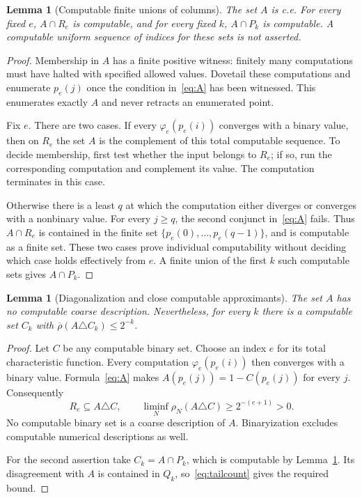 \documentclass[11pt,a4paper]{article}
\newcommand{\udens}{\overline\rho}
\newtheorem{lemma}[theorem]{Lemma}
\theoremstyle{definition}
\theoremstyle{remark}
\begin{document}
\begin{lemma}[Computable finite unions of columns]\label{lem:columncomp}
The set $A$ is c.e. For every fixed $e$, $A\cap R_e$ is computable, and
for every fixed $k$, $A\cap P_k$ is computable. A computable uniform
sequence of indices for these sets is not asserted.
\end{lemma}
\begin{proof}
Membership in $A$ has a finite positive witness: finitely many computations
must have halted with specified allowed values. Dovetail these computations
and enumerate $p_e(j)$ once the condition in~\eqref{eq:A} has been witnessed.
This enumerates exactly $A$ and never retracts an enumerated point.

Fix $e$. There are two cases. If every $\varphi_e(p_e(i))$ converges with a
binary value, then on $R_e$ the set $A$ is the complement of this total
computable sequence. To decide membership, first test whether the input
belongs to $R_e$; if so, run the corresponding computation and complement
its value. The computation terminates in this case.

Otherwise there is a least $q$ at which the computation either diverges
or converges with a nonbinary value. For every $j\ge q$, the second
conjunct in~\eqref{eq:A} fails. Thus $A\cap R_e$ is contained in the finite
set $\{p_e(0),\ldots,p_e(q-1)\}$, and is computable as a finite set.
These two cases prove individual computability without deciding which
case holds effectively from $e$. A finite union of the first $k$ such
computable sets gives $A\cap P_k$.
\end{proof}

\begin{lemma}[Diagonalization and close computable approximants]
\label{lem:noncoarse}
The set $A$ has no computable coarse description. Nevertheless, for every
$k$ there is a computable set $C_k$ with
$\udens(A\triangle C_k)\le2^{-k}$.
\end{lemma}
\begin{proof}
Let $C$ be any computable binary set. Choose an index $e$ for its total
characteristic function. Every computation $\varphi_e(p_e(i))$ then
converges with a binary value. Formula~\eqref{eq:A} makes
$A(p_e(j))=1-C(p_e(j))$ for every $j$. Consequently
\[
 R_e\subseteq A\triangle C,
 \qquad
 \liminf_N\rho_N(A\triangle C)\ge 2^{-(e+1)}>0.
\]
No computable binary set is a coarse description of $A$. Binaryization
excludes computable numerical descriptions as well.

For the second assertion take $C_k=A\cap P_k$, which is computable by
Lemma~\ref{lem:columncomp}. Its disagreement with $A$ is contained in
$Q_k$, so~\eqref{eq:tailcount} gives the required bound.
\end{proof}
\end{document}
